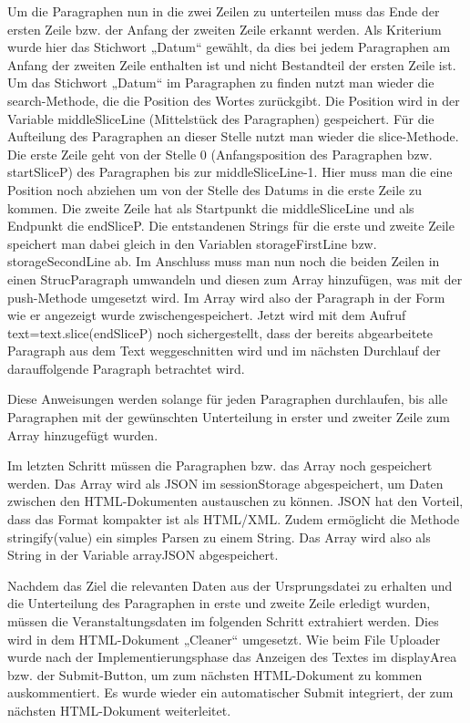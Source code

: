 {Um die Paragraphen nun in die zwei Zeilen zu unterteilen muss das Ende der ersten Zeile bzw. der Anfang der zweiten Zeile erkannt werden. Als Kriterium wurde hier das Stichwort „Datum“ gewählt, da dies bei jedem Paragraphen am Anfang der zweiten Zeile enthalten ist und nicht Bestandteil der ersten Zeile ist. Um das Stichwort „Datum“ im Paragraphen zu finden nutzt man wieder die search-Methode, die die Position des Wortes zurückgibt. Die Position wird in der Variable middleSliceLine (Mittelstück des Paragraphen) gespeichert. Für die Aufteilung des Paragraphen an dieser Stelle nutzt man wieder die slice-Methode. Die erste Zeile geht von der Stelle 0 (Anfangsposition des Paragraphen bzw. startSliceP) des Paragraphen bis zur middleSliceLine-1. Hier muss man die eine Position noch abziehen um von der Stelle des Datums in die erste Zeile zu kommen. Die zweite Zeile hat als Startpunkt die middleSliceLine und als Endpunkt die endSliceP. Die entstandenen Strings für die erste und zweite Zeile speichert man dabei gleich in den Variablen storageFirstLine bzw. storageSecondLine ab. Im Anschluss muss man nun noch die beiden Zeilen in einen StrucParagraph umwandeln und diesen zum Array hinzufügen, was mit der push-Methode umgesetzt wird. Im Array wird also der Paragraph in der Form wie er angezeigt wurde zwischengespeichert. Jetzt wird mit dem Aufruf text=text.slice(endSliceP) noch sichergestellt, dass der bereits abgearbeitete Paragraph aus dem Text weggeschnitten wird und im nächsten Durchlauf der darauffolgende Paragraph betrachtet wird.

Diese Anweisungen werden solange für jeden Paragraphen durchlaufen, bis alle Paragraphen mit der gewünschten Unterteilung in erster und zweiter Zeile zum Array hinzugefügt wurden.

Im letzten Schritt müssen die Paragraphen bzw. das Array noch gespeichert werden. Das Array wird als \ac{JSON} im sessionStorage abgespeichert, um Daten zwischen den HTML-Dokumenten austauschen zu können. JSON hat den Vorteil, dass das Format kompakter ist als HTML/XML. Zudem ermöglicht die Methode stringify(value) ein simples Parsen zu einem String. Das Array wird also als String in der Variable arrayJSON abgespeichert. 

Nachdem das Ziel die relevanten Daten aus der Ursprungsdatei zu erhalten und die Unterteilung des Paragraphen in erste und zweite Zeile erledigt wurden, müssen die Veranstaltungsdaten im folgenden Schritt extrahiert werden. Dies wird in dem HTML-Dokument „Cleaner“ umgesetzt. Wie beim File Uploader wurde nach der Implementierungsphase das Anzeigen des Textes im displayArea bzw. der Submit-Button, um zum nächsten HTML-Dokument zu kommen auskommentiert. Es wurde wieder ein automatischer Submit integriert, der zum nächsten HTML-Dokument weiterleitet.

}
